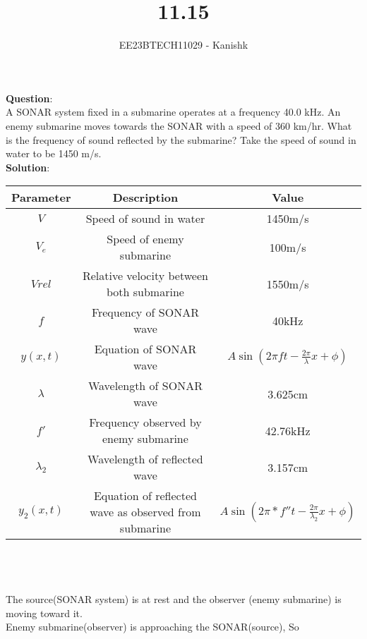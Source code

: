 \documentclass[journal,12pt,twocolumn]{IEEEtran}
\theoremstyle{remark}
\begin{document}

\vspace{3cm}

\title{11.15}
\author{EE23BTECH11029 - Kanishk}
\maketitle
\newpage

\bigskip

\renewcommand{\thefigure}{\theenumi}
\renewcommand{\thetable}{\theenumi}
\footnotesize
\textbf{Question}:\\ 

A SONAR system fixed in a submarine operates at a frequency 40.0 kHz. An enemy submarine moves towards the SONAR with a speed of 360 km/hr. What is the frequency of sound reflected by the submarine? Take the speed of sound in water to be 1450 m/s.\\

\textbf{Solution}:\\


\begin{tabular}{|c|c|c|}
   \hline
   Parameter & Description & Value\\
   \hline
   $V $& Speed of sound in water & 1450m/s\\
   \hline 
   $V_e$ & Speed of enemy submarine & 100m/s\\
   \hline 
   $Vrel$ & Relative velocity between both submarine & 1550m/s\\
   \hline
   $f $& Frequency of SONAR wave & 40kHz\\ 
   \hline
   $y(x,t)$ & Equation of SONAR wave & $A\sin(2\pi ft-\frac{2\pi}{\lambda}x+\phi)$\\
   \hline
   $\lambda$ & Wavelength of SONAR wave & 3.625cm\\
    \hline
   $ f' $& Frequency observed by enemy submarine & 42.76kHz\\
   \hline
   $\lambda_2$ & Wavelength of reflected wave & 3.157cm\\
   \hline 
  $ y_2(x,t)$ & Equation of reflected wave as observed from submarine& $A\sin(2\pi*f''t-\frac{2\pi}{\lambda_2}x+\phi)$\\
   \hline
\end{tabular}   
\\
\\
\\
The source(SONAR system) is at rest and the observer (enemy submarine) is moving toward it. \\
Enemy submarine(observer) is approaching the SONAR(source), So 
\end{document}
